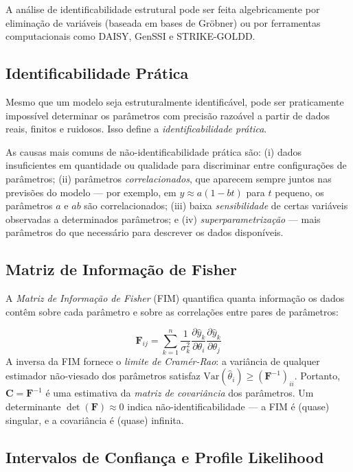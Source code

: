 A análise de identificabilidade estrutural pode ser feita algebricamente por eliminação de
variáveis (baseada em bases de Gröbner) ou por ferramentas computacionais como DAISY,
GenSSI e STRIKE-GOLDD.

\subsection{Identificabilidade Prática}

Mesmo que um modelo seja estruturalmente identificável, pode ser praticamente impossível
determinar os parâmetros com precisão razoável a partir de dados reais, finitos e ruidosos.
Isso define a \emph{identificabilidade prática}.

As causas mais comuns de não-identificabilidade prática são: (i) dados insuficientes em
quantidade ou qualidade para discriminar entre configurações de parâmetros; (ii) parâmetros
\emph{correlacionados}, que aparecem sempre juntos nas previsões do modelo --- por exemplo,
em $y \approx a(1 - bt)$ para $t$ pequeno, os parâmetros $a$ e $ab$ são correlacionados;
(iii) baixa \emph{sensibilidade} de certas variáveis observadas a determinados parâmetros;
e (iv) \emph{superparametrização} --- mais parâmetros do que necessário para descrever
os dados disponíveis.

\subsection{Matriz de Informação de Fisher}

A \emph{Matriz de Informação de Fisher} (FIM) quantifica quanta informação os dados
contêm sobre cada parâmetro e sobre as correlações entre pares de parâmetros:

\begin{equation}
\mathbf{F}_{ij} = \sum_{k=1}^{n} \frac{1}{\sigma_k^2} \frac{\partial \hat{y}_k}{\partial \theta_i} \frac{\partial \hat{y}_k}{\partial \theta_j}
\end{equation}
A inversa da FIM fornece o \emph{limite de Cramér-Rao}: a variância de qualquer estimador
não-viesado dos parâmetros satisfaz $\text{Var}(\hat{\theta}_i) \geq (\mathbf{F}^{-1})_{ii}$.
Portanto, $\mathbf{C} = \mathbf{F}^{-1}$ é uma estimativa da \emph{matriz de covariância}
dos parâmetros. Um determinante $\det(\mathbf{F}) \approx 0$ indica não-identificabilidade
--- a FIM é (quase) singular, e a covariância é (quase) infinita.

\subsection{Intervalos de Confiança e Profile Likelihood}

